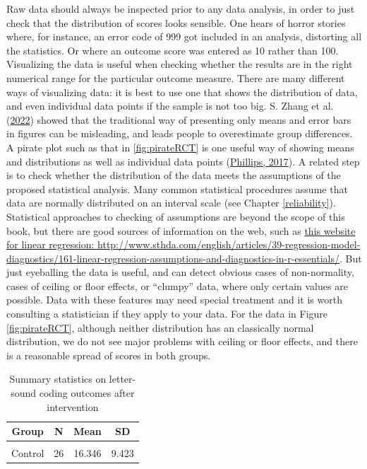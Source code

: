 \documentclass{krantz}
\begin{document}
Raw data should always be inspected prior to any data analysis, in order to just check that the distribution of scores looks sensible. One hears of horror stories where, for instance, an error code of 999 got included in an analysis, distorting all the statistics. Or where an outcome score was entered as 10 rather than 100. Visualizing the data is useful when checking whether the results are in the right numerical range for the particular outcome measure. There are many different ways of visualizing data: it is best to use one that shows the distribution of data, and even individual data points if the sample is not too big. S. Zhang et al. (\protect\hyperlink{ref-zhang2022}{2022}) showed that the traditional way of presenting only means and error bars in figures can be misleading, and leads people to overestimate group differences.
A pirate plot such as that in \ref{fig:pirateRCT} is one useful way of showing means and distributions as well as individual data points (\protect\hyperlink{ref-phillips2017}{Phillips, 2017}).
A related step is to check whether the distribution of the data meets the assumptions of the proposed statistical analysis. Many common statistical procedures assume that data are normally distributed on an interval scale (see Chapter \ref{reliability}). Statistical approaches to checking of assumptions are beyond the scope of this book, but there are good sources of information on the web, such as \href{http://www.sthda.com/english/articles/39-regression-model-diagnostics/161-linear-regression-assumptions-and-diagnostics-in-r-essentials/}{this website for linear regression: http://www.sthda.com/english/articles/39-regression-model-diagnostics/161-linear-regression-assumptions-and-diagnostics-in-r-essentials/}. But just eyeballing the data is useful, and can detect obvious cases of non-normality, cases of ceiling or floor effects, or ``clumpy'' data, where only certain values are possible. Data with these features may need special treatment and it is worth consulting a statistician if they apply to your data. For the data in Figure \ref{fig:pirateRCT}, although neither distribution has an classically normal distribution, we do not see major problems with ceiling or floor effects, and there is a reasonable spread of scores in both groups.

\begin{table}

\caption{\label{tab:table2gp}Summary statistics on letter-sound coding outcomes after intervention}
\centering
\begin{tabular}[t]{cccc}
\toprule
Group & N & Mean & SD\\
\midrule
\cellcolor{gray!6}{Intervention} & \cellcolor{gray!6}{28} & \cellcolor{gray!6}{22.286} & \cellcolor{gray!6}{7.282}\\
Control & 26 & 16.346 & 9.423\\
\bottomrule
\end{tabular}
\end{table}
\end{document}
